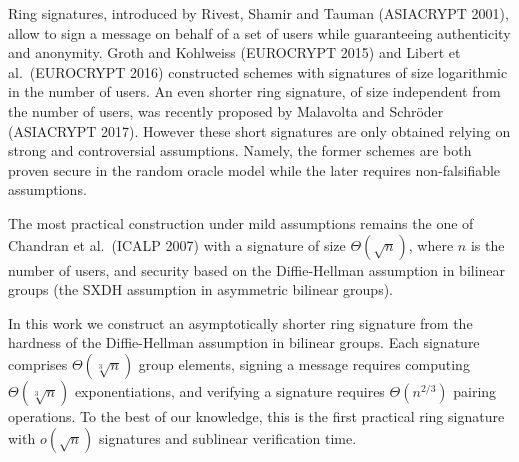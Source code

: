 
Ring signatures, introduced by Rivest, Shamir and Tauman (ASIACRYPT 2001), allow to sign a message on behalf of a set of users while guaranteeing authenticity and anonymity. Groth and Kohlweiss (EUROCRYPT 2015) and Libert et al.~(EUROCRYPT 2016) constructed schemes with signatures of size logarithmic in the number of users. An even shorter ring signature, of size independent from the number of users, was recently proposed by Malavolta and  Schr\"oder (ASIACRYPT 2017).
However these short signatures are only obtained relying on strong and controversial assumptions. Namely, the former schemes are both proven secure in the random oracle model while the later requires non-falsifiable assumptions.

The most practical construction under mild assumptions remains the one of Chandran et al.~(ICALP 2007) with a signature of size $\Theta(\sqrt{n})$, where $n$ is the number of users, and security based on the Diffie-Hellman assumption in bilinear groups (the SXDH assumption in asymmetric bilinear groups).

In this work we construct an asymptotically shorter ring signature from the hardness of the Diffie-Hellman assumption in bilinear groups.
 Each signature comprises $\Theta(\sqrt[3]{n})$ group elements, signing a message requires computing $\Theta(\sqrt[3]{n})$ exponentiations, and verifying a signature requires $\Theta(n^{2/3})$ pairing operations. To the best of our knowledge, this is the first practical ring signature with $o(\sqrt{n})$ signatures and sublinear verification time.
